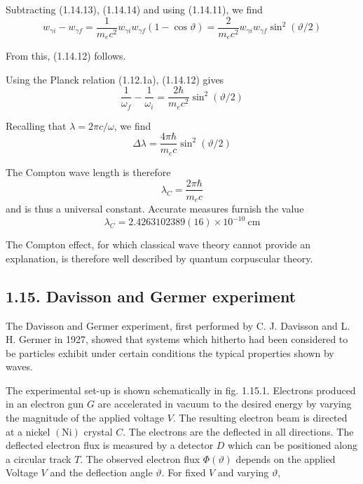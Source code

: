 \documentclass{article}
\begin{document}
Subtracting (1.14.13), (1.14.14) and using (1.14.11), we find
$$
\begin{equation*}
w_{\gamma i}-w_{\gamma f}=\frac{1}{m_{e} c^{2}} w_{\gamma i} w_{\gamma f}(1-\cos \vartheta)=\frac{2}{m_{e} c^{2}} w_{\gamma i} w_{\gamma f} \sin ^{2}(\vartheta / 2) \tag{1.14.15}
\end{equation*}
$$

From this, (1.14.12) follows.

Using the Planck relation (1.12.1a), (1.14.12) gives
$$
\begin{equation*}
\frac{1}{\omega_{f}}-\frac{1}{\omega_{i}}=\frac{2 \hbar}{m_{e} c^{2}} \sin ^{2}(\vartheta / 2) \tag{1.14.16}
\end{equation*}
$$

Recalling that $\lambda=2 \pi c / \omega$, we find
$$
\begin{equation*}
\Delta \lambda=\frac{4 \pi \hbar}{m_{e} c} \sin ^{2}(\vartheta / 2) \tag{1.14.17}
\end{equation*}
$$

The Compton wave length is therefore
$$
\begin{equation*}
\lambda_{C}=\frac{2 \pi \hbar}{m_{e} c} \tag{1.14.18}
\end{equation*}
$$
and is thus a universal constant. Accurate measures furnish the value
$$
\begin{equation*}
\lambda_{C}=2.4263102389(16) \times 10^{-10} \mathrm{~cm} \tag{1.14.19}
\end{equation*}
$$

The Compton effect, for which classical wave theory cannot provide an explanation, is therefore well described by quantum corpuscular theory.

\subsection*{1.15. Davisson and Germer experiment}

The Davisson and Germer experiment, first performed by C. J. Davisson and L. H. Germer in 1927, showed that systems which hitherto had been considered to be particles exhibit under certain conditions the typical properties shown by waves.

The experimental set-up is shown schematically in fig. 1.15.1. Electrons produced in an electron gun $G$ are accelerated in vacuum to the desired energy by varying the magnitude of the applied voltage $V$. The resulting electron beam is directed at a nickel $(\mathrm{Ni})$ crystal $C$. The electrons are the deflected in all directions. The deflected electron flux is measured by a detector $D$ which can be positioned along a circular track $T$. The observed electron flux $\Phi(\vartheta)$ depends on the applied Voltage $V$ and the deflection angle $\vartheta$. For fixed $V$ and varying $\vartheta$,
\end{document}
